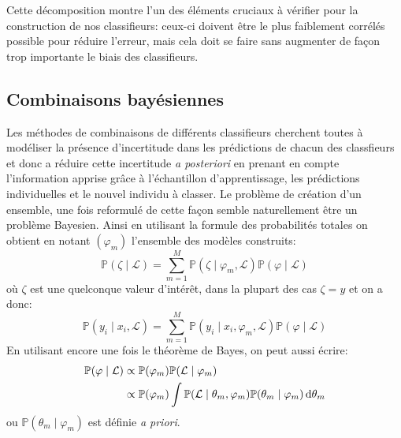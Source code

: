 Cette décomposition montre l'un des éléments cruciaux à vérifier pour la construction de nos classifieurs: ceux-ci doivent être le plus faiblement corrélés possible pour réduire l'erreur, mais cela doit se faire sans augmenter de façon trop importante le biais des classifieurs.

\subsection{Combinaisons bayésiennes}\label{subsec:bma}

Les méthodes de combinaisons de différents classifieurs cherchent toutes à modéliser la présence d'incertitude dans les prédictions de chacun des classfieurs et donc a réduire cette incertitude \emph{a posteriori} en prenant en compte l'information apprise grâce à l'échantillon d'apprentissage, les prédictions individuelles et le nouvel individu à classer. Le problème de création d'un ensemble, une fois reformulé de cette façon semble naturellement être un problème Bayesien.
Ainsi en utilisant la formule des probabilités totales on obtient en notant $\left( \varphi_m \right)$ l'ensemble des modèles construits:
\begin{equation}
    \mathbb{P} ( \zeta \mid \mathcal{L} ) = \sum_{m=1}^M \mathbb{P} (\zeta \mid \varphi_m , \mathcal{L}) \mathbb{P} ( \varphi \mid \mathcal{L} )
    \label{equ:bma}
\end{equation} 
où $\zeta$ est une quelconque valeur d'intérêt, dans la plupart des cas $\zeta = y$ et on a donc:
\begin{equation}
    \mathbb{P} ( y_i \mid x_i , \mathcal{L} ) = \sum_{m=1}^M \mathbb{P} (y_i \mid x_i,  \varphi_m , \mathcal{L}) \mathbb{P} ( \varphi \mid \mathcal{L} )
    \label{equ:bma2}
\end{equation} 
En utilisant encore une fois le théorème de Bayes, on peut aussi écrire:
\begin{align}
    \mathbb{P} ( \varphi \mid \mathcal{L} ) &\propto \mathbb{P} ( \varphi_m ) \mathbb{P} ( \mathcal{L} \mid \varphi_m ) \\
    &\propto \mathbb{P} ( \varphi_m ) \int \mathbb{P} ( \mathcal{L} \mid \theta_m , \varphi_m ) \mathbb{P} ( \theta_m \mid \varphi_m ) \mathop{}\!\mathrm{d} \theta_m
    \label{equ:bayes}
\end{align}
ou $\mathbb{P} ( \theta_m \mid \varphi_m )$ est définie \emph{a priori}.


